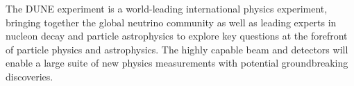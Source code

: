 The DUNE experiment is a world-leading international physics
experiment, bringing together the %
global neutrino community as well as leading experts in nucleon decay
and particle astrophysics to explore key questions at the forefront of
particle physics and astrophysics. The highly capable beam and
detectors will enable a large suite of new physics measurements with
potential groundbreaking discoveries.










